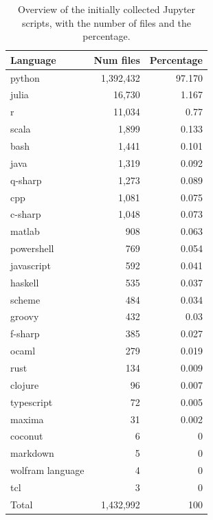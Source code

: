 \documentclass[10pt]{article} %
\begin{document}
\begin{table}[t]
\centering
\begin{tabular}{lrr}\toprule
 \textbf{Language} &  \textbf{Num files} & \textbf{Percentage}\\\midrule
python & 1,392,432 & 97.170\\
julia & 16,730 & 1.167\\
r & 11,034 & 0.77\\
scala & 1,899 & 0.133\\
bash & 1,441 & 0.101\\
java & 1,319 & 0.092\\
q-sharp & 1,273 & 0.089\\
cpp & 1,081 & 0.075\\
c-sharp & 1,048 & 0.073\\
matlab & 908 & 0.063\\
powershell & 769 & 0.054\\
javascript & 592 & 0.041\\
haskell & 535 & 0.037\\
scheme & 484 & 0.034\\
groovy & 432 & 0.03\\
f-sharp & 385 & 0.027\\
ocaml & 279 & 0.019\\
rust & 134 & 0.009\\
clojure & 96 & 0.007\\
typescript & 72 & 0.005\\
maxima & 31 & 0.002\\
coconut & 6 & 0\\
markdown & 5 & 0\\
wolfram language & 4 & 0\\
tcl & 3 & 0\\\midrule
Total &1,432,992& 100\\\bottomrule
\end{tabular}
\caption{Overview of the initially collected Jupyter scripts, with the number of files and the percentage.}
\label{tab:jupyter_script_pl}
\end{table}
\end{document}
